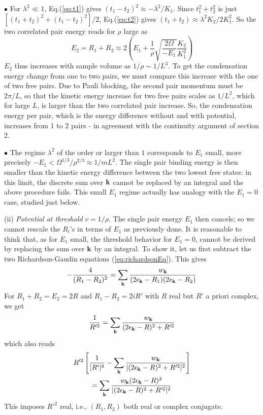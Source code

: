 \documentclass[5p,twocolumn]{elsarticle}
\begin{document}
$\bullet$ For $\lambda^{2}\ll1$, Eq.(\ref{eq:t1}) gives $(t_{1}-t_{2})^{2}\approx-\lambda^{2}/K_{1}$. Since $t_{1}^{2}+t_{2}^{2}$ is just $\left[(t_{1}+t_{2})^{2}+(t_{1}-t_{2})^{2}\right]/2$,  Eq.(\ref{eq:t2}) gives $(t_{1}+t_{2})\approx\lambda^{2}K_{2}/2K_{1}^{2}$.  So the two correlated pair energy  reads for $\rho$ large as 
\begin{equation}
E_{2}=R_{1}+R_{2}\approx2\left(E_{1}+\frac{1}{\rho}\sqrt{\frac{2\Omega}{-E_{1}}}\frac{K_{2}}{K_{1}^{2}}\right)
\end{equation}
$E_{2}$ thus increases with sample volume as $1/\rho\sim1/L^{3}$.
To get the condensation energy change from one to two pairs, we must compare this increase with the one of two free pairs.  Due to Pauli blocking, the second pair momentum must be $2\pi/L$, so that the kinetic energy increase for two free pairs scales as $1/L^{2}$, which for large $L$, is larger than the two correlated pair increase. 
So, the condensation energy per pair, which is the energy difference without and with potential, increases from 1 to 2 pairs - in agreement with the continuity argument of section 2. 

 $\bullet$ The regime $\lambda^{2}$ of the order or larger than $1$ corresponds to $E_{1}$ small, more precisely $-E_{1}<\Omega^{1/3}/\rho^{2/3}\approx1/mL^{2}$.  The single pair binding energy is then smaller than the kinetic energy difference between the two lowest free states: in this limit, the discrete sum over $\mathbf{k}$ cannot be replaced by an integral and the above procedure fails.  This small $E_1$ regime  actually has analogy with the $E_1=0$ case, studied just below. 


(ii) {\it Potential at threshold} $v=1/\rho$. The single pair energy $E_1$ then cancels; so we cannot rescale the $R_i$'s in terms of $E_1$ as previously done. It is reasonable to think that, as for $E_1$ small, the threshold behavior for $E_1=0$, cannot be derived by replacing the sum over $\mathbf{k}$ by an integral.
To show it, let us first subtract the two Richardson-Gaudin equations (\ref{eq:richardsonEq}). This gives
\begin{equation}
-\frac{4}{(R_1-R_2)^2}=\sum_{\mathbf{k}}\frac{w_{\mathbf{k}}}{(2\epsilon_{\mathbf{k}}-R_1)(2\epsilon_{\mathbf{k}}-R_2)}\label{eq:2PairMinus}
\end{equation}
For $R_1+R_2=E_2=2R$ and $R_1-R_2=2iR'$ with $R$ real but $R'$ a priori complex, we get
\begin{equation}
\frac{1}{R'^2}=\sum_{\mathbf{k}}\frac{w_{\mathbf{k}}}{(2\epsilon_{\mathbf{k}}-R)^2+R'^2}
\end{equation}
which also reads 
\begin{multline}
R'^{2}\left[\frac{1}{|R'|^{4}}-\sum_{\mathbf{k}}\frac{w_{\mathbf{k}}}{|(2\epsilon_{\mathbf{k}}-R)^{2}+R'^{2}|^{2}}\right]\\
=\sum_{\mathbf{k}}\frac{w_{\mathbf{k}}(2\epsilon_{\mathbf{k}}-R)^{2}}{|(2\epsilon_{\mathbf{k}}-R)^{2}+R'^{2}|^{2}}
\end{multline}
This imposes $R'^2$ real, i.e., $(R_1,R_2)$ both real or complex conjugate.
\end{document}

